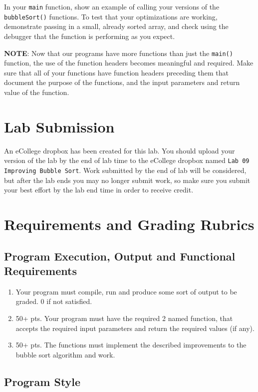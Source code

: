 \documentclass[11pt]{article}
\begin{document}
In your \verb~main~ function, show an example of calling your versions of
the \verb~bubbleSort()~ functions.  To test that your optimizations are
working, demonstrate passing in a small, already sorted array, and
check using the debugger that the function is performing as you
expect.

\textbf{NOTE}: Now that our programs have more functions than just the
\verb~main()~ function, the use of the function headers becomes meaningful
and required.  Make sure that all of your functions have function
headers preceding them that document the purpose of the functions, and
the input parameters and return value of the function.
\section*{Lab Submission}
\label{sec-4}

An eCollege dropbox has been created for this lab.  You should upload
your version of the lab by the end of lab time to the eCollege dropbox
named \verb~Lab 09 Improving Bubble Sort~.  Work submitted by the end of
lab will be considered, but after the lab ends you may no longer
submit work, so make sure you submit your best effort by the lab end
time in order to receive credit.
\section*{Requirements and Grading Rubrics}
\label{sec-5}

\subsection*{Program Execution, Output and Functional Requirements}
\label{sec-5-1}

\begin{enumerate}
\item Your program must compile, run and produce some sort of output to be
graded. 0 if not satisfied.
\item 50+ pts.  Your program must have the required 2 named function,
that accepts the required input parameters and return the required
values (if any).
\item 50+ pts. The functions must implement the described improvements
to the bubble sort algorithm and work.
\end{enumerate}

\subsection*{Program Style}
\label{sec-5-2}
\end{document}
